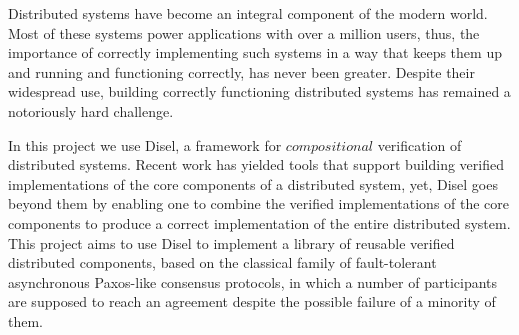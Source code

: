 Distributed systems have become an integral component of the modern world.
Most of these systems power applications with over a million users, thus,
the importance of correctly implementing such systems in a way that keeps them up and
running and functioning correctly, has never been greater.
Despite their widespread use, building correctly functioning distributed systems
has remained a notoriously hard challenge.

In this project we use Disel, a framework for $compositional$ verification
of distributed systems. Recent work has yielded tools that support building
verified implementations of the core components of a distributed system, yet,
Disel goes beyond them by enabling one to combine
the verified implementations of the core components to produce a
correct implementation of the entire distributed system.
This project aims to use Disel to implement a library of reusable
verified distributed components, based on the classical family of
fault-tolerant asynchronous Paxos-like consensus protocols, in which
a number of participants are supposed to reach
an agreement despite the possible failure of a minority of them.
